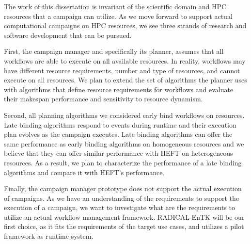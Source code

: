 The work of this dissertation is invariant of the scientific domain and HPC
resources that a campaign can utilize. As we move forward to support actual
computational campaigns on HPC resources, we see three strands of research and
software development that can be pursued.

First, the campaign manager and specifically its planner, assumes that all
workflows are able to execute on all available resources. In reality,
workflows may have different resource requirements, number and type of
resources, and cannot execute on all resources. We plan to extend the set of
algorithms the planner uses with algorithms that define resource requirements
for workflows and evaluate their makespan performance and sensitivity to
resource dynamism.

Second, all planning algorithms we considered early bind workflows on resources.
Late binding algorithms respond to events during runtime and their execution
plan evolves as the campaign executes. Late binding algorithms can offer the
same performance as early binding algorithms on homogeneous resources and we
believe that they can offer similar performance with HEFT on heterogeneous
resources. As a result, we plan to characterize the performance of a late
binding algorithms and compare it with HEFT's performance.

Finally, the campaign manager prototype does not support the actual execution of
campaigns. As we have an understanding of the requirements to support the
execution of a campaign, we want to investigate what are the requirements to
utilize an actual workflow management framework. RADICAL-EnTK will be our
first choice, as it fits the requirements of the target use cases, and utilizes
a pilot framework as runtime system.
